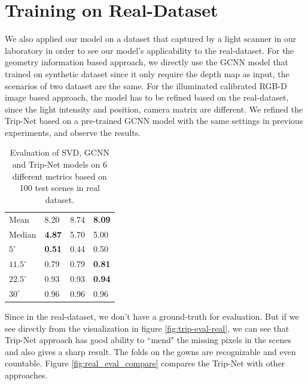 \section{Training on Real-Dataset}
We also applied our model on a dataset that captured by a light scanner in our laboratory in order to see our model's applicability to the real-dataset. For the geometry information based approach, we directly use the GCNN model that trained on synthetic dataset since it only require the depth map as input, the scenarios of two dataset are the same. For the illuminated calibrated RGB-D image based approach, the model has to be refined based on the real-dataset, since the light intensity and position, camera matrix are different. We refined the Trip-Net based on a pre-trained GCNN model with the same settings in previous experiments, and observe the results. 

\begin{table}[H]
	\centering
	\begin{tabular}{l | l l l }
		\toprule
		\tabhead{Metrics} & \tabhead{SVD} & \tabhead{GCNN} & \tabhead{Trip-Net} \\
		\midrule
		Mean  					& 8.20 & 8.74 & \textbf{8.09}\\ 
		\hline
		Median					& \textbf{4.87} & 5.70 & 5.00 \\ 
		\hline
		$ 5^\circ $ 			& \textbf{0.51} & 0.44 & 0.50 \\
		\hline
		$ 11.5^\circ $ 			& 0.79 & 0.79 & \textbf{0.81} \\
		\hline
		$ 22.5^\circ $ 			& 0.93 & 0.93 & \textbf{0.94} \\
		\hline
		$ 30^\circ $ 			& 0.96 & 0.96 & 0.96 \\
		\bottomrule
	\end{tabular}
	\caption{Evaluation of SVD, GCNN and Trip-Net models on 6 different metrics based on 100 test scenes in real dataset.}	
	\label{tab:real_eval}
\end{table}





Since in the real-dataset, we don't have a ground-truth for evaluation. But if we see directly from the visualization in figure \ref{fig:trip-eval-real}, we can see that Trip-Net approach has good ability to  ``mend" the missing pixels in the scenes and also gives a sharp result. The folds on the gowns are recognizable and even countable. Figure \ref{fig:real_eval_compare} compares the Trip-Net with other approaches.


